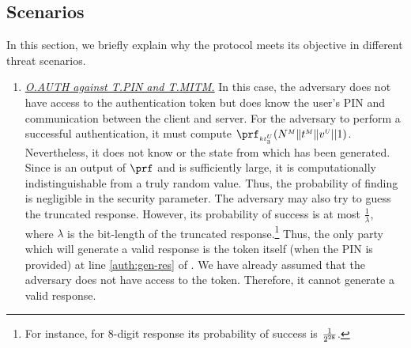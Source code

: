 \vspace{-3mm}
\subsection{Scenarios}
In this section, we briefly explain why the protocol meets its objective in different threat scenarios. 

\begin{enumerate}[leftmargin=5mm]

\item\underline{\textit{O.AUTH against 
T.PIN and T.MITM.}}  In this case, the adversary does not have
access to the authentication token but does know the user's PIN and communication between the client and server.  For the adversary to perform a successful authentication, it must compute $\prf_{\sss\VC{\keyt_{\sss 3}}}(\VM{\nonce} \|  \VM{\trans} \| \VC{\verifier}|| 1)$. Nevertheless, it does not know  or the state from which  has been generated. Since   is an output of $\prf$ and is sufficiently large, it is computationally indistinguishable from a truly random value. Thus,  the probability of finding  is negligible in the security parameter.  The adversary may also try to guess the truncated response. However, its probability of success is at most $\frac{1}{\lambda}$, where $\lambda$ is the bit-length of the truncated response.\footnote{For instance, for $8$-digit response its probability of success is $\frac{1}{2^{\scriptscriptstyle 28}}$.}  
%
Thus, the only party which will generate a valid response is the token itself (when the PIN is provided) at line \ref{auth:gen-res} of .  We have already assumed that the adversary does not have access to the token. Therefore, it cannot generate a valid response.%


\end{enumerate}
